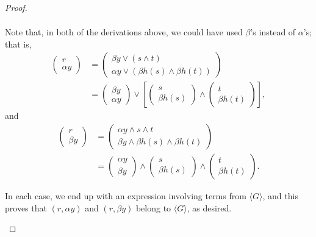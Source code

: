 \begin{proof}
\begin{itemize}
\begin{align*}
\end{align*}
Note that, in both of the derivations above, we could have used $\beta$'s instead of $\alpha$'s; that is,
\begin{align*}
\left(\begin{array}{c} r \\ \alpha y\end{array}\right) &= 
\left(\begin{array}{c} \beta y \vee (s\wedge t) \\ \alpha y \vee (\beta {h(s)} \wedge \beta {h(t)}) \end{array}\right)\\
&= \left(\begin{array}{c} \beta y\\ \alpha y\end{array}\right) \vee
\left[\left(\begin{array}{c}s \\ \beta {h(s)}\end{array}\right) \wedge \left(\begin{array}{c}t \\ \beta {h(t)} \end{array}\right)\right],
\end{align*}
and
\begin{align*}
\left(\begin{array}{c} r \\ \beta y\end{array}\right) &= 
\left(\begin{array}{c} \alpha y \wedge s\wedge t \\ \beta y \wedge \beta {h(s)} \wedge \beta {h(t)} \end{array}\right)\\
&= \left(\begin{array}{c} \alpha y\\ \beta y\end{array}\right) \wedge 
\left(\begin{array}{c}s \\ \beta {h(s)}\end{array}\right) \wedge \left(\begin{array}{c}t \\ \beta {h(t)} \end{array}\right).
\end{align*}

In each case, we end up with an expression involving terms from $\langle G \rangle$, 
and this proves that $(r, \alpha y)$ and $(r, \beta y)$ belong to $\langle G \rangle$, as desired.
\end{itemize}
\end{proof}

